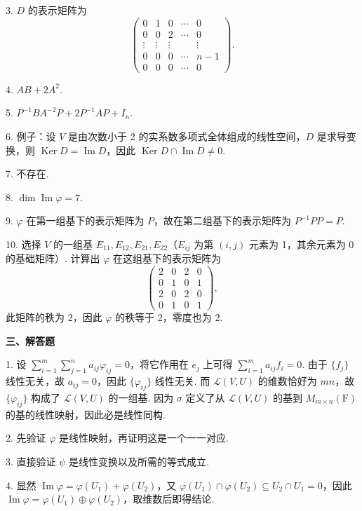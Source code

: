 \documentclass[UTF8,12pt,a4paper,fontset=fandol]{ctexart}
\begin{document}
3. $D$ 的表示矩阵为
\[
\left(\begin{array}{ccccc}
0 & 1 & 0 & \cdots & 0\\
0 & 0 & 2 & \cdots & 0\\
\vdots & \vdots & \vdots &        & \vdots\\
0 & 0 & 0 & \cdots & n-1\\
0 & 0 & 0 & \cdots & 0
\end{array}\right).
\]

4. $AB+2A^2$.

5. $P^{-1}BA^{-2}P+2P^{-1}AP+I_n$.

6. 例子：设 $V$ 是由次数小于 2 的实系数多项式全体组成的线性空间，$D$ 是求导变换，则 $\operatorname{Ker}D=\operatorname{Im}D$，因此 $\operatorname{Ker}D\cap\operatorname{Im}D\ne0$.

7. 不存在.

8. $\dim\operatorname{Im}\varphi=7$.

9. $\varphi$ 在第一组基下的表示矩阵为 $P$，故在第二组基下的表示矩阵为 $P^{-1}PP=P$.

10. 选择 $V$ 的一组基 $E_{11},E_{12},E_{21},E_{22}$（$E_{ij}$ 为第 $(i,j)$ 元素为 1，其余元素为 0 的基础矩阵）. 计算出 $\varphi$ 在这组基下的表示矩阵为
\[
\left(\begin{array}{rrrr}
2 & 0 & 2 & 0\\
0 & 1 & 0 & 1\\
2 & 0 & 2 & 0\\
0 & 1 & 0 & 1
\end{array}\right),
\]
此矩阵的秩为 2，因此 $\varphi$ 的秩等于 2，零度也为 2.

\noindent\textbf{三、解答题}

1. 设 $\sum_{i=1}^m\sum_{j=1}^n a_{ij}\varphi_{ij}=0$，将它作用在 $e_j$ 上可得 $\sum_{i=1}^m a_{ij}f_i=0$. 由于 $\{f_j\}$ 线性无关，故 $a_{ij}=0$，因此 $\{\varphi_{ij}\}$ 线性无关. 而 $\mathcal{L}(V,U)$ 的维数恰好为 $mn$，故 $\{\varphi_{ij}\}$ 构成了 $\mathcal{L}(V,U)$ 的一组基. 因为 $\sigma$ 定义了从 $\mathcal{L}(V,U)$ 的基到 $M_{m\times n}(\mathrm{F})$ 的基的线性映射，因此必是线性同构.

2. 先验证 $\varphi$ 是线性映射，再证明这是一个一一对应.

3. 直接验证 $\psi$ 是线性变换以及所需的等式成立.

4. 显然 $\operatorname{Im}\varphi=\varphi(U_1)+\varphi(U_2)$，又 $\varphi(U_1)\cap\varphi(U_2)\subseteq U_2\cap U_1=0$，因此 $\operatorname{Im}\varphi=\varphi(U_1)\oplus\varphi(U_2)$，取维数后即得结论.
\end{document}
